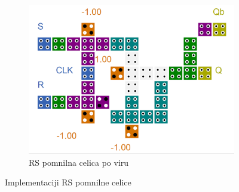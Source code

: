 \documentclass[a4paper, 11pt]{article}
\begin{document}
\begin{figure}[h!]
\begin{subfigure}[b]{0.4\textwidth}
	\includegraphics[width=\textwidth]{../img/vir_5/rs.png} 
	\caption{RS pomnilna celica po viru \cite{a_novel_approach}}
	\label{fig-rs-2}
	\end{subfigure}
	\caption{Implementaciji RS pomnilne celice}
	\label{fig-rs}
\end{figure}
\end{document}
